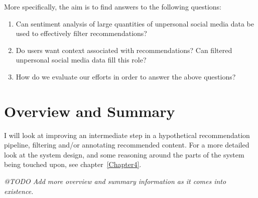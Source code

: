 More specifically, the aim is to find answers to the following questions:

\begin{enumerate}
  \item Can sentiment analysis of large quantities of unpersonal social media data be used to effectively filter recommendations?
  \item Do users want context associated with recommendations? Can filtered unpersonal social media data fill this role?
  \item How do we evaluate our efforts in order to answer the above questions?
\end{enumerate}


\section{Overview and Summary}

I will look at improving an intermediate step in a hypothetical recommendation pipeline, filtering and/or annotating recommended content.
For a more detailed look at the system design, and some reasoning around the parts of the system being touched upon, see chapter~\ref{Chapter4}.

\emph{@TODO Add more overview and summary information as it comes into existence.}


